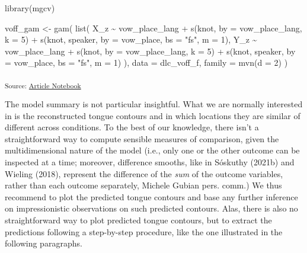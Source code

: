 \documentclass[
]{interact}
\newenvironment{Shaded}{\begin{snugshade}}{\end{snugshade}}
\newcommand{\AttributeTok}[1]{\textcolor[rgb]{0.40,0.45,0.13}{#1}}
\newcommand{\DecValTok}[1]{\textcolor[rgb]{0.68,0.00,0.00}{#1}}
\newcommand{\FunctionTok}[1]{\textcolor[rgb]{0.28,0.35,0.67}{#1}}
\newcommand{\NormalTok}[1]{\textcolor[rgb]{0.00,0.23,0.31}{#1}}
\newcommand{\OtherTok}[1]{\textcolor[rgb]{0.00,0.23,0.31}{#1}}
\newcommand{\SpecialCharTok}[1]{\textcolor[rgb]{0.37,0.37,0.37}{#1}}
\newcommand{\StringTok}[1]{\textcolor[rgb]{0.13,0.47,0.30}{#1}}
\begin{document}
\begin{Shaded}
\begin{Highlighting}[]
\FunctionTok{library}\NormalTok{(mgcv)}

\NormalTok{voff\_gam }\OtherTok{\textless{}{-}} \FunctionTok{gam}\NormalTok{(}
  \FunctionTok{list}\NormalTok{(}
\NormalTok{    X\_z }\SpecialCharTok{\textasciitilde{}}\NormalTok{ vow\_place\_lang }\SpecialCharTok{+}
      \FunctionTok{s}\NormalTok{(knot, }\AttributeTok{by =}\NormalTok{ vow\_place\_lang, }\AttributeTok{k =} \DecValTok{5}\NormalTok{) }\SpecialCharTok{+}
      \FunctionTok{s}\NormalTok{(knot, speaker, }\AttributeTok{by =}\NormalTok{ vow\_place, }\AttributeTok{bs =} \StringTok{"fs"}\NormalTok{, }\AttributeTok{m =} \DecValTok{1}\NormalTok{),}
\NormalTok{    Y\_z }\SpecialCharTok{\textasciitilde{}}\NormalTok{ vow\_place\_lang }\SpecialCharTok{+}
      \FunctionTok{s}\NormalTok{(knot, }\AttributeTok{by =}\NormalTok{ vow\_place\_lang, }\AttributeTok{k =} \DecValTok{5}\NormalTok{) }\SpecialCharTok{+}
      \FunctionTok{s}\NormalTok{(knot, speaker, }\AttributeTok{by =}\NormalTok{ vow\_place, }\AttributeTok{bs =} \StringTok{"fs"}\NormalTok{, }\AttributeTok{m =} \DecValTok{1}\NormalTok{)}
\NormalTok{  ),}
  \AttributeTok{data =}\NormalTok{ dlc\_voff\_f,}
  \AttributeTok{family =} \FunctionTok{mvn}\NormalTok{(}\AttributeTok{d =} \DecValTok{2}\NormalTok{)}
\NormalTok{)}
\end{Highlighting}
\end{Shaded}

\textsubscript{Source:
\href{https://stefanocoretta.github.io/mv_uti/index.qmd.html}{Article
Notebook}}

The model summary is not particular insightful. What we are normally
interested in is the reconstructed tongue contours and in which
locations they are similar of different across conditions. To the best
of our knowledge, there isn't a straightforward way to compute sensible
measures of comparison, given the multidimensional nature of the model
(i.e., only one or the other outcome can be inspected at a time;
moreover, difference smooths, like in Sóskuthy (2021b) and Wieling
(2018), represent the difference of the \emph{sum} of the outcome
variables, rather than each outcome separately, Michele Gubian pers.
comm.) We thus recommend to plot the predicted tongue contours and base
any further inference on impressionistic observations on such predicted
contours. Alas, there is also no straightforward way to plot predicted
tongue contours, but to extract the predictions following a step-by-step
procedure, like the one illustrated in the following paragraphs.
\end{document}
